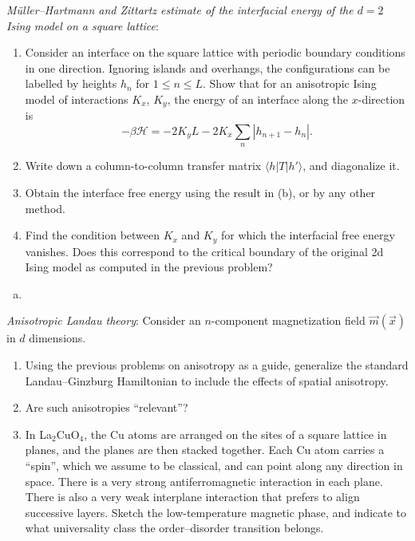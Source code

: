 \begin{problem}
    \textit{M\"{u}ller--Hartmann and Zittartz estimate of the interfacial energy of the $d=2$ Ising model on a square lattice}:

    \begin{enumerate}
        \item[(a)] Consider an interface on the square lattice with periodic boundary conditions in one direction. Ignoring islands and overhangs, the configurations can be labelled by heights $h_n$ for $1 \leq n \leq L$. Show that for an anisotropic Ising model of interactions $K_x$, $K_y$, the energy of an interface along the $x$-direction is
        \[
            -\beta\mathcal{H} = -2K_y L - 2K_x\sum_n|h_{n+1} - h_n|.
        \]

        \item[(b)] Write down a column-to-column transfer matrix $\langle h|T|h'\rangle$, and diagonalize it.

        \item[(c)] Obtain the interface free energy using the result in (b), or by any other method.

        \item[(d)] Find the condition between $K_x$ and $K_y$ for which the interfacial free energy vanishes. Does this correspond to the critical boundary of the original 2d Ising model as computed in the previous problem?
    \end{enumerate}
\end{problem}

\begin{solution}
    \begin{enumerate}[(a)]
        \item
    \end{enumerate}
\end{solution}

\begin{problem}
    \textit{Anisotropic Landau theory}: Consider an $n$-component magnetization field $\vec{m}(\vec{x})$ in $d$ dimensions.

    \begin{enumerate}
        \item[(a)] Using the previous problems on anisotropy as a guide, generalize the standard Landau--Ginzburg Hamiltonian to include the effects of spatial anisotropy.

        \item[(b)] Are such anisotropies ``relevant''?

        \item[(c)] In La$_2$CuO$_4$, the Cu atoms are arranged on the sites of a square lattice in planes, and the planes are then stacked together. Each Cu atom carries a ``spin'', which we assume to be classical, and can point along any direction in space. There is a very strong antiferromagnetic interaction in each plane. There is also a very weak interplane interaction that prefers to align successive layers. Sketch the low-temperature magnetic phase, and indicate to what universality class the order--disorder transition belongs.
    \end{enumerate}
\end{problem}


